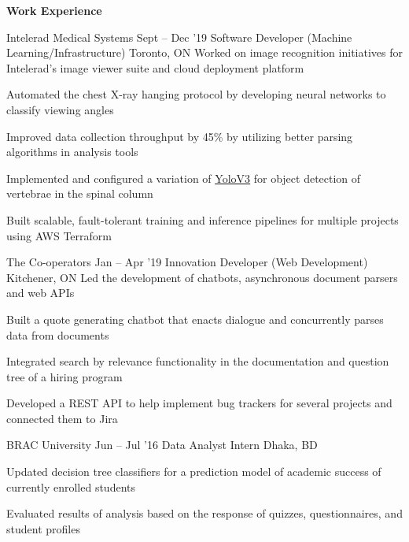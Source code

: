 \documentclass{resume} %
\DeclareRobustCommand{\&}{%
  \ifdim\fontdimen1\font>0pt
    \textsl{\symbol{`\&}}%
  \else
    \symbol{`\&}%
  \fi
}
\begin{document}
\begin{rSection}{\textbf{Work Experience}}

  \begin{rWorkSection}{Intelerad Medical Systems}
   {Sept -- Dec '19}
   		{Software Developer (Machine Learning/Infrastructure)}
		{Toronto, ON}
		{Worked on image recognition initiatives for Intelerad's image viewer suite and cloud deployment platform}
		\item Automated the chest X-ray hanging protocol by developing neural networks to classify viewing angles
		\item Improved data collection throughput by 45\% by utilizing better parsing algorithms in analysis tools
		\item Implemented and configured a variation of {\underline{\href{https://pjreddie.com/media/files/papers/YOLOv3.pdf}{YoloV3}}} for object detection of vertebrae in the spinal column
		\item Built scalable, fault-tolerant training and inference pipelines for multiple projects using AWS Terraform
  \end{rWorkSection}

  \begin{rWorkSection}{The Co-operators}
    {Jan -- Apr '19}
         {Innovation Developer (Web Development)}
         {Kitchener, ON}
         {Led the development of chatbots, asynchronous document parsers and web APIs}
       \item Built a quote generating chatbot that enacts dialogue and concurrently parses data from documents
       \item Integrated search by relevance functionality in the documentation and question tree of a hiring program
        \item Developed a REST API to help implement bug trackers for several projects and connected them to Jira

  \end{rWorkSection}

	\begin{rWorkSection}{BRAC University}
		{Jun -- Jul '16}
		{Data Analyst Intern}
		{Dhaka, BD}
		{}
		\item Updated decision tree classifiers for a prediction model of academic success of currently enrolled students
		\item Evaluated results of analysis based on the response of quizzes, questionnaires, and student profiles
	\end{rWorkSection}
  
\end{rSection} 
\end{document}
